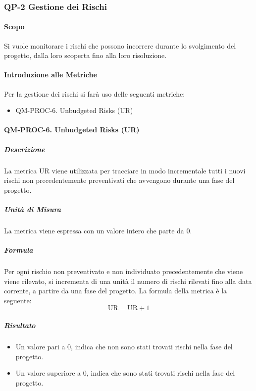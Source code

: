 	\subsubsection{QP-2 Gestione dei Rischi}

		\paragraph{Scopo}
		
		Si vuole monitorare i rischi che possono incorrere durante lo svolgimento del progetto, dalla loro scoperta fino alla loro risoluzione.

		\paragraph{Introduzione alle Metriche}

		Per la gestione dei rischi si farà uso delle seguenti metriche:

		\begin{itemize}
			\item QM-PROC-6. Unbudgeted Risks (UR)
		\end{itemize}

		\paragraph{QM-PROC-6. Unbudgeted Risks (UR)}

			\subparagraph{Descrizione}
			La metrica UR viene utilizzata per tracciare in modo incrementale tutti i nuovi rischi non precedentemente preventivati che avvengono durante una fase del progetto.

			\subparagraph{Unità di Misura}
			La metrica viene espressa con un valore intero che parte da 0.

			\subparagraph{Formula}
			Per ogni rischio non preventivato e non individuato precedentemente che viene viene rilevato, si incrementa di una unità il numero di rischi rilevati fino alla data corrente, a partire da una fase del progetto.
			La formula della metrica è la seguente:
			\[
				\text{UR} = \text{UR} + 1
			\]

			\subparagraph{Risultato}
			\begin{itemize}
				\item Un valore pari a 0, indica che non sono stati trovati rischi nella fase del progetto.
				\item Un valore superiore a 0, indica che sono stati trovati rischi nella fase del progetto.
			\end{itemize}

